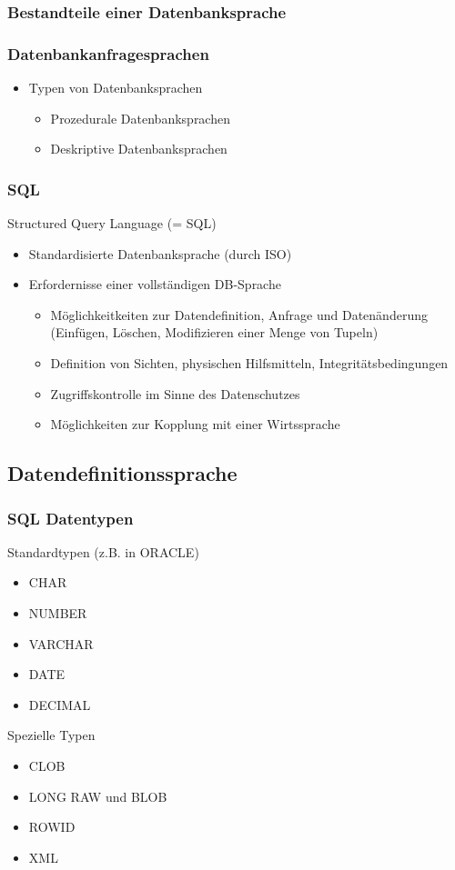 \subsubsection{Bestandteile einer Datenbanksprache}
\subsubsection{Datenbankanfragesprachen}
\begin{itemize}
	\item Typen von Datenbanksprachen
\begin{itemize}
	\item Prozedurale Datenbanksprachen
	\item Deskriptive Datenbanksprachen
\end{itemize}
\end{itemize}
\subsubsection{SQL}
Structured Query Language (= SQL)
\begin{itemize}
	\item Standardisierte Datenbanksprache (durch ISO)
	\item Erfordernisse einer vollständigen DB-Sprache
	\begin{itemize}
		\item Möglichkeitkeiten zur Datendefinition, Anfrage und Datenänderung (Einfügen, Löschen, Modifizieren einer Menge von Tupeln)
		\item Definition von Sichten, physischen Hilfsmitteln, Integritätsbedingungen
		\item Zugriffskontrolle im Sinne des Datenschutzes
		\item Möglichkeiten zur Kopplung mit einer Wirtssprache
	\end{itemize}
\end{itemize}
\subsection{Datendefinitionssprache}
\subsubsection{SQL Datentypen}
Standardtypen (z.B. in ORACLE)
\begin{itemize}
	\item CHAR
	\item NUMBER
	\item VARCHAR
	\item DATE
	\item DECIMAL
\end{itemize}
Spezielle Typen
\begin{itemize}
	\item CLOB
	\item LONG RAW und BLOB
	\item ROWID
	\item XML
\end{itemize}
